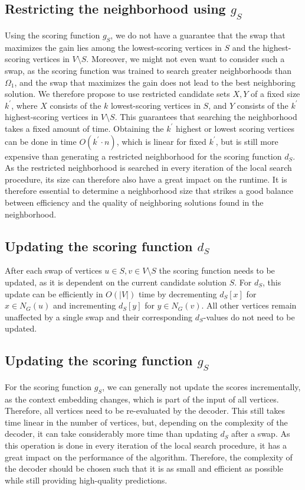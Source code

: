 \documentclass[draft,final]{vutinfth} %
\begin{document}
\subsection{Restricting the neighborhood using $g_S$}

Using the scoring function $g_S$, we do not have a guarantee that the swap that maximizes the gain lies among the lowest-scoring vertices in $S$ and the highest-scoring vertices in $V \setminus S$. Moreover, we might not even want to consider such a swap, as the scoring function was trained to search greater neighborhoods than $\Omega_1$, and the swap that maximizes the gain does not lead to the best neighboring solution. We therefore propose to use restricted candidate sets $X, Y$ of a fixed size $k^\prime$, where $X$ consists of the $k$ lowest-scoring vertices in $S$, and $Y$ consists of the $k^\prime$ highest-scoring vertices in $V \setminus S$. This guarantees that searching the neighborhood takes a fixed amount of time. 
Obtaining the $k^\prime$ highest or lowest scoring vertices can be done in time $O(k^\prime \cdot n)$, which is linear for fixed $k^\prime$, but is still more expensive than generating a restricted neighborhood for the scoring function $d_S$. As the restricted neighborhood is searched in every iteration of the local search procedure, its size can therefore also have a great impact on the runtime. It is therefore essential to determine a neighborhood size that strikes a good balance between efficiency and the quality of neighboring solutions found in the neighborhood. 


\subsection{Updating the scoring function $d_S$}
After each swap of vertices $u \in S, v \in V \setminus S$ the scoring function needs to be updated, as it is dependent on the current candidate solution $S$. For $d_S$, this update can be efficiently in $O(|V|)$ time by decrementing $d_S[x]$ for $x \in N_G(u)$ and incrementing $d_S[y]$ for $y \in N_G(v)$. All other vertices remain unaffected by a single swap and their corresponding $d_S$-values do not need to be updated. 

\subsection{Updating the scoring function $g_S$}

For the scoring function $g_S$, we can generally not update the scores incrementally, as the context embedding changes, which is part of the input of all vertices. Therefore, all vertices need to be re-evaluated by the decoder. This still takes time linear in the number of vertices, but, depending on the complexity of the decoder, it can take considerably more time than updating $d_S$ after a swap. As this operation is done in every iteration of the local search procedure, it has a great impact on the performance of the algorithm. Therefore, the complexity of the decoder should be chosen such that it is as small and efficient as possible while still providing high-quality predictions. 
\end{document}
